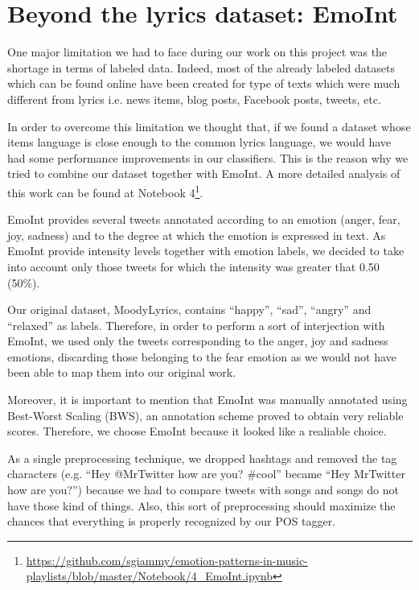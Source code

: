 \section{Beyond the lyrics dataset: EmoInt}

One major limitation we had to face during our work on this project was the shortage in terms of labeled data.
Indeed, most of the already labeled datasets which can be found online have been created for type of texts
which were much different from lyrics i.e. news items, blog posts, Facebook posts, tweets, etc.

In order to overcome this limitation we thought that, if we found a dataset whose items language is close enough
to the common lyrics language, we would have had some performance improvements in our classifiers. This is the
reason why we tried to combine our dataset together with EmoInt\cite{emoint}.
A more detailed analysis of this work can be found at Notebook 4\footnote{\url{https://github.com/sgiammy/emotion-patterns-in-music-playlists/blob/master/Notebook/4_EmoInt.ipynb}}.

EmoInt provides several tweets annotated according to an emotion (anger, fear, joy, sadness) and to the degree 
at which the emotion is expressed in text. As EmoInt provide intensity levels together with emotion labels, 
we decided to take into account only those tweets for which the intensity was greater that 0.50 (50\%). 

Our original dataset, MoodyLyrics, contains ``happy'', ``sad'', ``angry'' and ``relaxed'' as labels. 
Therefore, in order to perform a sort of interjection with EmoInt, we used only the tweets corresponding to the anger, 
joy and sadness emotions, discarding those belonging to the fear emotion as we would not have been able to map them into
our original work.

Moreover, it is important to mention that EmoInt was manually annotated using Best-Worst Scaling (BWS)\cite{bws}, 
an annotation scheme proved to obtain very reliable scores. Therefore, we choose EmoInt because it looked
like a realiable choice.

As a single preprocessing technique, we dropped hashtags and removed the tag characters 
(e.g. ``Hey @MrTwitter how are you? \#cool'' became ``Hey MrTwitter how are you?'') because 
we had to compare tweets with songs and songs do not have those kind of things. Also, 
this sort of preprocessing should maximize the chances that everything is properly recognized by our POS tagger.

